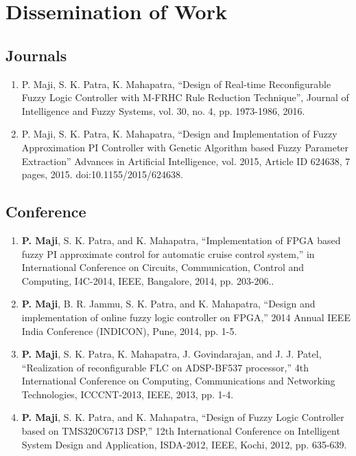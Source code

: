 \chapter{Dissemination of Work}

\section*{Journals}
\begin{enumerate}
    \item P. Maji, S. K. Patra, K. Mahapatra, ``Design of Real-time Reconfigurable Fuzzy Logic Controller with M-FRHC Rule Reduction Technique'', Journal of Intelligence and Fuzzy Systems,  vol. 30, no. 4, pp. 1973-1986, 2016.
    \item P. Maji, S. K. Patra, K. Mahapatra, ``Design and Implementation of Fuzzy Approximation PI Controller with Genetic Algorithm based Fuzzy Parameter Extraction'' Advances in Artificial Intelligence, vol. 2015, Article ID 624638, 7 pages, 2015. doi:10.1155/2015/624638. 
\end{enumerate}

\section*{Conference}
\begin{enumerate}
    \item \textbf{P. Maji}, S. K. Patra, and K. Mahapatra, ``Implementation of FPGA based fuzzy PI approximate control for automatic cruise control system,'' in International Conference on Circuits, Communication, Control and Computing, I4C-2014, IEEE, Bangalore, 2014, pp. 203-206..
	\item \textbf{P. Maji}, B. R. Jammu, S. K. Patra, and K. Mahapatra, ``Design and implementation of online fuzzy logic controller on FPGA,'' 2014 Annual IEEE India Conference (INDICON), Pune, 2014, pp. 1-5.
	\item \textbf{P. Maji}, S. K. Patra, K. Mahapatra, J. Govindarajan, and J. J. Patel, ``Realization of reconfigurable FLC on ADSP-BF537 processor,'' 4th International Conference on Computing, Communications and Networking Technologies, ICCCNT-2013, IEEE, 2013, pp. 1-4.
	\item \textbf{P. Maji}, S. K. Patra, and K. Mahapatra, ``Design of Fuzzy Logic Controller based on TMS320C6713 DSP,'' 12th International Conference on Intelligent System Design and Application, ISDA-2012, IEEE, Kochi, 2012, pp. 635-639.
\end{enumerate}


